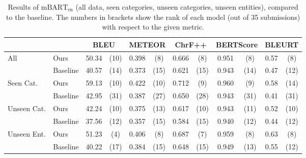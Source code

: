 \begin{table}[t]
    \footnotesize\centering
    \begin{tabular}{llcccccccccc}\toprule
                                     &          & \multicolumn{2}{c}{\bf BLEU} & \multicolumn{2}{c}{\bf METEOR} & \multicolumn{2}{c}{\bf ChrF++} & \multicolumn{2}{c}{\bf BERTScore} & \multicolumn{2}{c}{\bf BLEURT}                                     \\\midrule
        \multirow{2}{*}{All}         & Ours     & 50.34                        & (10)                           & 0.398                          & (8)                               & 0.666                          & (8)  & 0.951 & (8)  & 0.57 & (8)  \\
                                     & Baseline & 40.57                        & (14)                           & 0.373                          & (15)                              & 0.621                          & (15) & 0.943 & (14) & 0.47 & (12) \\\midrule
        \multirow{2}{*}{Seen Cat.}   & Ours     & 59.13                        & (10)                           & 0.422                          & (10)                              & 0.712                          & (9)  & 0.960 & (9)  & 0.58 & (14) \\
                                     & Baseline & 42.95                        & (31)                           & 0.387                          & (27)                              & 0.650                          & (28) & 0.943 & (31) & 0.41 & (31) \\\midrule
        \multirow{2}{*}{Unseen Cat.} & Ours     & 42.24                        & (10)                           & 0.375                          & (13)                              & 0.617                          & (10) & 0.943 & (11) & 0.52 & (10) \\
                                     & Baseline & 37.56                        & (12)                           & 0.357                          & (15)                              & 0.584                          & (15) & 0.940 & (12) & 0.44 & (12) \\\midrule
        \multirow{2}{*}{Unseen Ent.} & Ours     & 51.23                        & (4)                            & 0.406                          & (8)                               & 0.687                          & (7)  & 0.959 & (8)  & 0.63 & (8)  \\
                                     & Baseline & 40.22                        & (17)                           & 0.384                          & (15)                              & 0.648                          & (15) & 0.949 & (13) & 0.55 & (12) \\\bottomrule
    \end{tabular}
    \caption{Results of $\text{mBART}_{\text{en}}$ (all data, seen categories, unseen categories, unseen entities), compared to the baseline. The numbers in brackets show the rank of each model (out of 35 submissions) with respect to the given metric.}
    \label{tab:mbart:results-en}
\end{table}
